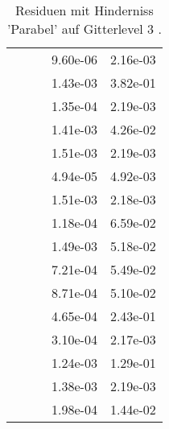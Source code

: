 \begin{table}
\begin{tabular}{c|cc|cc|}
\multicolumn{1}{|c|}{} & \multicolumn{1}{|c|}{} & \multicolumn{1}{|c|}{} & \multicolumn{1}{|c|}{  9.60e-06} & \multicolumn{1}{|c|}{  2.16e-03} \\ 
\multicolumn{1}{|c|}{} & \multicolumn{1}{|c|}{} & \multicolumn{1}{|c|}{} & \multicolumn{1}{|c|}{  1.43e-03} & \multicolumn{1}{|c|}{  3.82e-01} \\ 
\multicolumn{1}{|c|}{} & \multicolumn{1}{|c|}{} & \multicolumn{1}{|c|}{} & \multicolumn{1}{|c|}{  1.35e-04} & \multicolumn{1}{|c|}{  2.19e-03} \\ 
\multicolumn{1}{|c|}{} & \multicolumn{1}{|c|}{} & \multicolumn{1}{|c|}{} & \multicolumn{1}{|c|}{  1.41e-03} & \multicolumn{1}{|c|}{  4.26e-02} \\ 
\multicolumn{1}{|c|}{} & \multicolumn{1}{|c|}{} & \multicolumn{1}{|c|}{} & \multicolumn{1}{|c|}{  1.51e-03} & \multicolumn{1}{|c|}{  2.19e-03} \\ 
\multicolumn{1}{|c|}{} & \multicolumn{1}{|c|}{} & \multicolumn{1}{|c|}{} & \multicolumn{1}{|c|}{  4.94e-05} & \multicolumn{1}{|c|}{  4.92e-03} \\ 
\multicolumn{1}{|c|}{} & \multicolumn{1}{|c|}{} & \multicolumn{1}{|c|}{} & \multicolumn{1}{|c|}{  1.51e-03} & \multicolumn{1}{|c|}{  2.18e-03} \\ 
\multicolumn{1}{|c|}{} & \multicolumn{1}{|c|}{} & \multicolumn{1}{|c|}{} & \multicolumn{1}{|c|}{  1.18e-04} & \multicolumn{1}{|c|}{  6.59e-02} \\ 
\multicolumn{1}{|c|}{} & \multicolumn{1}{|c|}{} & \multicolumn{1}{|c|}{} & \multicolumn{1}{|c|}{  1.49e-03} & \multicolumn{1}{|c|}{  5.18e-02} \\ 
\multicolumn{1}{|c|}{} & \multicolumn{1}{|c|}{} & \multicolumn{1}{|c|}{} & \multicolumn{1}{|c|}{  7.21e-04} & \multicolumn{1}{|c|}{  5.49e-02} \\ 
\multicolumn{1}{|c|}{} & \multicolumn{1}{|c|}{} & \multicolumn{1}{|c|}{} & \multicolumn{1}{|c|}{  8.71e-04} & \multicolumn{1}{|c|}{  5.10e-02} \\ 
\multicolumn{1}{|c|}{} & \multicolumn{1}{|c|}{} & \multicolumn{1}{|c|}{} & \multicolumn{1}{|c|}{  4.65e-04} & \multicolumn{1}{|c|}{  2.43e-01} \\ 
\multicolumn{1}{|c|}{} & \multicolumn{1}{|c|}{} & \multicolumn{1}{|c|}{} & \multicolumn{1}{|c|}{  3.10e-04} & \multicolumn{1}{|c|}{  2.17e-03} \\ 
\multicolumn{1}{|c|}{} & \multicolumn{1}{|c|}{} & \multicolumn{1}{|c|}{} & \multicolumn{1}{|c|}{  1.24e-03} & \multicolumn{1}{|c|}{  1.29e-01} \\ 
\multicolumn{1}{|c|}{} & \multicolumn{1}{|c|}{} & \multicolumn{1}{|c|}{} & \multicolumn{1}{|c|}{  1.38e-03} & \multicolumn{1}{|c|}{  2.19e-03} \\ 
\multicolumn{1}{|c|}{} & \multicolumn{1}{|c|}{} & \multicolumn{1}{|c|}{} & \multicolumn{1}{|c|}{  1.98e-04} & \multicolumn{1}{|c|}{  1.44e-02} \\ 
\hline 
\end{tabular}\caption{Residuen mit Hinderniss 'Parabel' auf Gitterlevel 3 .}\label{tab:Residuum_Parabel_level3}
\end{table} 
